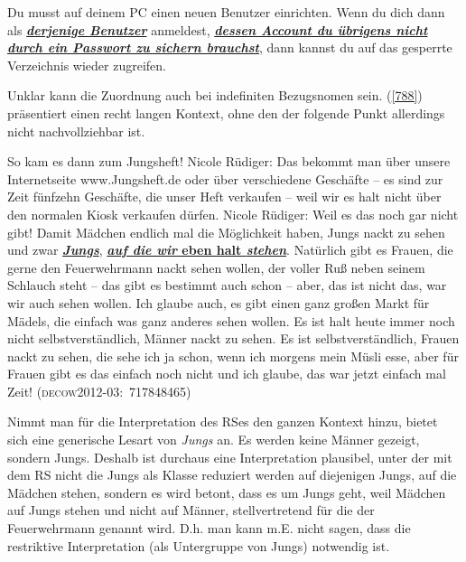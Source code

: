 \begin{exe}
	\ex\label{787} 

	Du musst auf deinem PC einen neuen Benutzer einrichten. Wenn du dich dann als \ul{\textit{\textbf{derjenige Benutzer}}} anmeldest, \ul{\textit{\textbf{dessen Account du übrigens nicht durch ein Passwort zu sichern brauchst}}}, dann kannst du auf das gesperrte Verzeichnis wieder zugreifen.
\end{exe}								
Unklar kann die Zuordnung auch bei indefiniten Bezugsnomen sein. (\ref{788}) präsentiert einen recht langen Kontext, ohne den der folgende Punkt allerdings nicht nachvollziehbar ist.

\begin{exe}
	\ex\label{788} 

	So kam es dann zum Jungsheft! Nicole Rüdiger: Das bekommt man über unsere Internetseite www.Jungs\-heft.de oder über verschiedene Geschäfte – es sind zur Zeit fünfzehn Geschäfte, die unser Heft verkaufen – weil wir es halt nicht über den normalen Kiosk verkaufen dürfen. Nicole Rüdiger: Weil es das noch gar nicht gibt! Damit Mädchen endlich mal die Möglichkeit haben, Jungs nackt zu sehen und zwar \ul{\textit{\textbf{Jungs}}}, \ul{\textbf{\textit{auf die wir} eben halt \textit{stehen}}}. Natürlich gibt es Frauen, die gerne den Feuerwehrmann nackt sehen wollen, der voller Ruß neben seinem Schlauch steht – das gibt es bestimmt auch schon – aber, das ist nicht das, war wir auch sehen wollen. Ich glaube auch, es gibt einen ganz großen Markt für Mädels, die einfach was ganz anderes sehen wollen. Es ist halt heute immer noch nicht selbstverständlich, Männer nackt zu sehen. Es ist selbstverständlich, Frauen nackt zu sehen, die sehe ich ja schon, wenn ich morgens mein Müsli esse, aber für Frauen gibt es das einfach noch nicht und ich glaube, das war jetzt einfach mal Zeit!
	\hfill\hbox{\scshape(decow2012-03: 717848465)}
\end{exe}
Nimmt man für die Interpretation des RSes den ganzen Kontext hinzu, bietet sich eine generische Lesart von \textit{Jungs} an. Es werden keine Männer gezeigt, sondern Jungs. Deshalb ist durchaus eine Interpretation plausibel, unter der mit dem RS nicht die Jungs als Klasse reduziert werden auf diejenigen Jungs, auf die Mädchen stehen, sondern es wird betont, dass es um Jungs geht, weil Mädchen auf Jungs stehen und nicht auf Männer, stellvertretend für die der Feuerwehrmann genannt wird. D.h. man kann m.E. nicht sagen, dass die restriktive Interpretation (als Untergruppe von Jungs) notwendig ist. 


